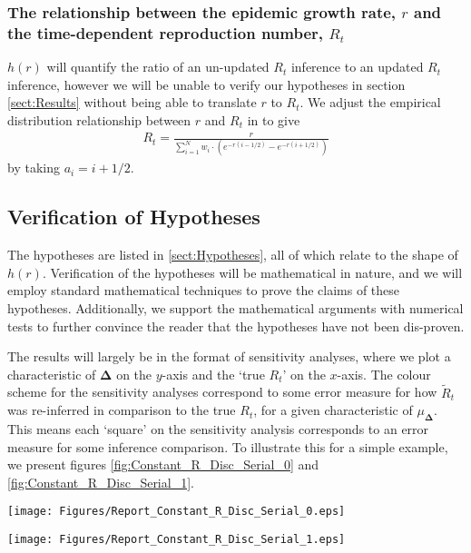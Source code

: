 \documentclass[10pt,journal,compsoc]{IEEEtran}
\begin{document}
\subsubsection{The relationship between the epidemic growth rate, $r$ and the time-dependent reproduction number, $R_t$}

$h(r)$ will quantify the ratio of an un-updated $R_t$ inference to an updated $R_t$ inference, however we will be unable to verify our hypotheses in section \ref{sect:Results} without being able to translate $r$ to $R_t$. We adjust the empirical distribution relationship between $r$ and $R_t$ in \cite{Wallinga-Lipsitch} to give 
\begin{align*}\label{eq:r_to_R}
  R_t = \frac{r}{\sum^N_{i=1}w_i \cdot(e^{-r(i-1/2)} - e^{-r(i+1/2)})}
\end{align*}
by taking $a_i = i+1/2$. 
\subsection{Verification of Hypotheses}
The hypotheses are listed in \ref{sect:Hypotheses}, all of which relate to the shape of $h(r)$. Verification of the hypotheses will be mathematical in nature, and we will employ standard mathematical techniques to prove the claims of these hypotheses. Additionally, we support the mathematical arguments with numerical tests to further convince the reader that the hypotheses have not been dis-proven.


The results will largely be in the format of sensitivity analyses, where we plot a characteristic of $\boldsymbol{\Delta}$ on the $y$-axis and the `true $R_t$' on the $x$-axis. The colour scheme for the sensitivity analyses correspond to some error measure for how $\tilde{R}_t$ was re-inferred in comparison to the true $R_t$, for a given characteristic of $\mu_{\boldsymbol{\Delta}}$. This means each `square' on the sensitivity analysis corresponds to an error measure for some inference comparison. To illustrate this for a simple example, we present figures \ref{fig:Constant_R_Disc_Serial_0} and \ref{fig:Constant_R_Disc_Serial_1}.

\begin{minipage}{0.95\linewidth}
\centering
\texttt{[image: Figures/Report\_Constant\_R\_Disc\_Serial\_0.eps]}
\label{fig:Constant_R_Disc_Serial_0}
\end{minipage}  
  
\begin{minipage}{0.95\linewidth}
\centering
\texttt{[image: Figures/Report\_Constant\_R\_Disc\_Serial\_1.eps]}
\label{fig:Constant_R_Disc_Serial_1}
\end{minipage}
\end{document}
